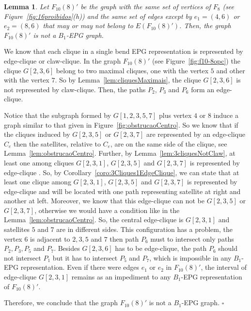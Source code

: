 \documentclass[9pt]{entcs}
\newtheorem{lema}{Lemma}[section]
\begin{document}
% 

\begin{lema}\label{lem:F10-8opcIsNotB1EPG}
Let $F_{10}(8)'$ be the graph with the same set of vertices of $F_{8}$ (see Figure~\ref{fig:16proibidos}(h)) and the same set of edges except by $e_1=(4,6)$ or   $e_2=(8,6)$  that may or may not belong to $E(F_{10}(8)')$. Then, the graph $F_{10}(8)'$  is not a $B_1$-EPG graph. 
\end{lema}

\begin{pf}
We know that each clique in a single bend EPG representation is represented by edge-clique or claw-clique. In the graph $F_{10}(8)'$ (see Figure~\ref{fig:f10-8opc}) the clique $G[2,3,6]$ belong to two maximal cliques, one with the vertex $5$ and other with the vertex $7$. So by Lemma~\ref{lem:cliquesMaximais}, the clique $G[2,3,6]$ is not represented by claw-clique. Then, the paths $P_{2}$, $P_{3}$ and $P_{6}$ form  an edge-clique.

Notice that the subgraph formed by $G[1,2,3,5,7]$ plus vertex $4$ or $8$ induce a graph similar to that given in Figure~\ref{fig:obstrucaoCentro}. So we know that if the cliques induced by $G[2,3,5]$ or $G[2,3,7]$ are represented by an edge-clique $C_e$ then the satellites, relative to $C_e$, are on the same side of the clique, see Lemma~\ref{lem:obstrucaoCentro}. Further, by Lemma~\ref{lem:3cliquesNotClaw}, at least one among cliques $G[2,3,1]$, $G[2,3,5]$ and $G[2,3,7]$  is represented by edge-clique .
So, by Corollary~\ref{coro:3Cliques1EdgeClique}, we can state that at least one clique among $G[2,3,1]$, $G[2,3,5]$ and $G[2,3,7]$ is represented by edge-clique and will be located with one path representing satellite at right and another at left. Moreover, we know that this edge-clique can not be $G[2,3,5]$ or $G[2,3,7]$, otherwise we would have a condition like in the Lemma~\ref{lem:obstrucaoCentro}. So, the central edge-clique is $G[2,3,1]$ and satellites $5$ and $7$ are in different sides. This configuration has a problem, the vertex $6$ is adjacent to $2, 3, 5$ and $7$ then path $P_6$ must to intersect only paths $P_2, P_3, P_5$ and $P_7$. Besides $G[2,3,6]$ has to be edge-clique, the path $P_6$  should not intersect $P_1$ but it has to intersect $P_5$ and $P_7$, which is impossible in any $B_1$-EPG representation.  Even if there were edges $e_1$ or $e_2$ in $F_{10}(8)'$, the interval of edge-clique $G[2,3,1]$ remains as an impediment to any $B_1$-EPG representation of $F_{10}(8)'$.

Therefore, we conclude that the graph $F_{10}(8)'$ is not a $B_1$-EPG graph.
 $\square$\end{pf} 
\end{document}
